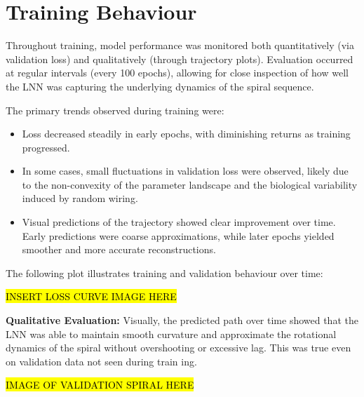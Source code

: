 \section{Training Behaviour}
Throughout training, model performance was monitored both quantitatively (via validation loss) and qualitatively (through trajectory plots). Evaluation occurred at regular intervals (every 100 epochs), allowing for close inspection of how well the LNN was capturing the underlying dynamics of the spiral sequence.

\noindent The primary trends observed during training were:
\begin{itemize}
    \item Loss decreased steadily in early epochs, with diminishing returns as training progressed.
    \item In some cases, small fluctuations in validation loss were observed, likely due to the non-convexity of the parameter landscape and the biological variability induced by random wiring.
    \item Visual predictions of the trajectory showed clear improvement over time. Early predictions were coarse approximations, while later epochs yielded smoother and more accurate reconstructions.
\end{itemize}

\noindent The following plot illustrates training and validation behaviour over time:

\hl{INSERT LOSS CURVE IMAGE HERE}


\vspace{1em}
\noindent \textbf{Qualitative Evaluation:}  
Visually, the predicted path over time showed that the LNN was able to maintain smooth curvature and approximate the rotational dynamics of the spiral without overshooting or excessive lag. This was true even on validation data not seen during train ing.

\hl{IMAGE OF VALIDATION SPIRAL HERE}


